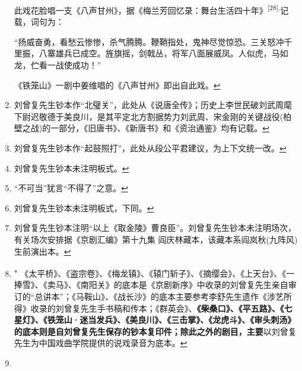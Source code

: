 \begin{enumerate}
  此戏花脸唱一支《八声甘州》，据《梅兰芳回忆录：舞台生活四十年》\textsuperscript{{[}28{]}.}记载，词句为：

  ``扬威奋勇，看愁云惨惨，杀气腾腾。鞭鞘指处，鬼神尽觉惊恐。三关怒冲千里振，八寨雄兵已成空。旌旗摇，剑戟丛，将军八面展威凤。人似虎，马如龙，伫看一战使成功！''

  《铁笼山》一剧中姜维唱的《八声甘州》即出自此戏。\protect\hyperlink{fnref671}{↩}
\item
  \leavevmode\hypertarget{fn672}{}%
  刘曾复先生钞本作``北璧关''，此处从《说唐全传》；历史上李世民破刘武周麾下尉迟敬德于美良川，是其平定北方割据势力刘武周、宋金刚的关键战役(柏壁之战)的一部分，《旧唐书》、《新唐书》和《资治通鉴》均有记载。\protect\hyperlink{fnref672}{↩}
\item
  \leavevmode\hypertarget{fn673}{}%
  刘曾复先生钞本作``起鼓照打''，此处从段公平君建议，为上下文统一改。\protect\hyperlink{fnref673}{↩}
\item
  \leavevmode\hypertarget{fn674}{}%
  刘曾复先生钞本未注明板式。\protect\hyperlink{fnref674}{↩}
\item
  \leavevmode\hypertarget{fn675}{}%
  ``不可当''犹言``不得了''之意。\protect\hyperlink{fnref675}{↩}
\item
  \leavevmode\hypertarget{fn676}{}%
  刘曾复先生钞本未注明板式，下同。\protect\hyperlink{fnref676}{↩}
\item
  \leavevmode\hypertarget{fn677}{}%
  刘曾复先生钞本注明``以上《取金陵》曹良臣''。刘曾复先生钞本未注明场次，有关场次安排据《京剧汇编》第十九集
  阎庆林藏本，该藏本系阎岚秋(九阵风)生前演出本。\protect\hyperlink{fnref677}{↩}
\item
  \leavevmode\hypertarget{fn678}{}%
  \textsuperscript{∗}
  《太平桥》、《盗宗卷》、《梅龙镇》、《辕门斩子》、《摘缨会》、《上天台》、《一捧雪》、《卖马》、《南阳关》的底本是《京剧新序》中收录的刘曾复先生亲自审订的``总讲本''；《马鞍山》、《战长沙》的底本主要参考李舒先生遗作《涉艺所得》收录的刘曾复先生手书稿和传本；《群英会》、\textbf{《柴桑口》、《平五路》、《七星灯》、《铁笼山·迷当发兵》、《美良川》、《三击掌》、《龙虎斗》、《审头刺汤》的底本则是自刘曾复先生保存的钞本复印件；除此之外的剧目，主要}以刘曾复先生为中国戏曲学院提供的说戏录音为底本。\protect\hyperlink{fnref678}{↩}
\item
\end{enumerate}
